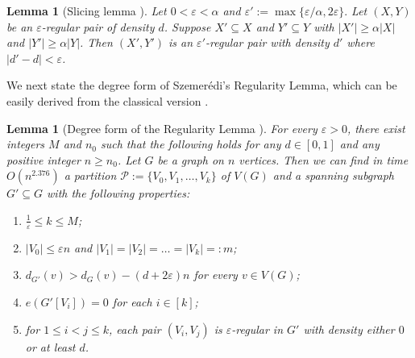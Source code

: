 \documentclass[11pt, a4paper]{article}
\newtheorem{lemma}[theorem]{Lemma}
\theoremstyle{definition}
\newcommand{\eps}{\varepsilon}
\newcommand{\<}{\subseteq}
\begin{document}
\begin{lemma}[Slicing lemma  \cite{Komlos2000}]\label{regular-subgraph}
    Let $0<\eps<\alpha$ and $\eps':=\max\{\eps/\alpha,2\eps\}.$ Let $(X,Y)$ be an $\eps$-regular pair of density $d$. Suppose $X'\subseteq X$ and $Y'\subseteq Y$ with $|X'|\geq \alpha |X|$ and $|Y'|\geq \alpha |Y|$. Then $(X',Y')$ is an $\eps'$-regular pair with density $d'$ where $|d'-d|<\eps$. 
\end{lemma} 

We next state the degree form of Szemer\'{e}di's Regularity Lemma, which can be easily derived from the classical version \cite{Szeme1978}.

\begin{lemma}[Degree form of the Regularity Lemma  \cite{ADLR1994,Szeme1978}]\label{thm: degree form of RL}
For every $\eps>0$, there exist integers $M$ and $n_0$ such that the following holds for any $d\in [0,1]$ and any positive integer $n\ge n_0$. Let $G$ be a graph on $n$ vertices. Then we can find in time $O(n^{2.376})$ a partition $\mathcal{P}:=\{V_0,V_1, \dots,V_k\}$ of $V(G)$ and a spanning subgraph $G'\subseteq G$ with the following properties:
\begin{enumerate}[label = (\arabic{enumi})]
\rm \item\label{pro1} $\frac{1}{\eps}\le k \le M$;
\rm \item\label{pro2} $|V_0|\le \eps n$ and $|V_1|=|V_2|=\dots=|V_k|=:m$; %
\rm \item\label{pro3} $d_{G'}(v)>d_{G}(v)-(d+2\eps)n$ for every $v\in V(G)$;
\rm \item\label{pro4} $e(G'[V_i])=0$ for each $i\in [k]$;
\rm \item\label{pro5} for $1\le i<j\le k$, each pair $(V_i,V_j)$ is $\eps$-regular in $G'$ with density {either} $0$ or at least $d$.
\end{enumerate}
\end{lemma}
\end{document}
